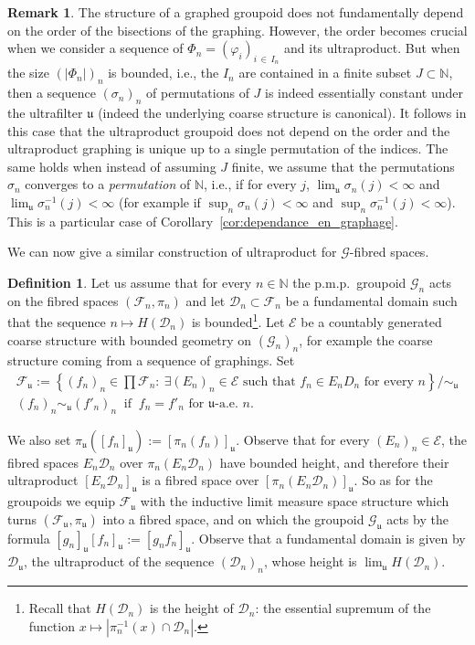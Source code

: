 \documentclass[10pt]{amsart}
\theoremstyle{definition}
\newtheorem{rema}[cdrthm]{Remark}
\newtheorem{defi}[cdrthm]{Definition}
\newcommand{\Nmath}{\mathbb{N}}
\newcommand{\coarse}{\mathcal{E}}
\newcommand{\cg}{\mathcal{G}}
\newcommand{\cf}{\mathcal{F}}
\newcommand{\cd}{\mathcal{D}}
\newcommand{\ul}{\mathfrak{u}}
\newcommand{\ulae}{\mathfrak{u}\textrm{-a.e. }n}
\newcommand{\ph}{\varphi}
\newcommand{\pmp}{p.m.p.\ }
\let\oldexists\exists
\renewcommand*{\exists}{\mathrel{\oldexists}}
\begin{document}
\begin{rema}\label{rem: order of the graphings and ultra-prod}
The structure of a graphed groupoid does not fundamentally depend on the order of the bisections of the graphing. However, the order becomes crucial when we consider a sequence of $\Phi_n=(\ph_i)_{i\,\in\,I_n}$ and its ultraproduct. But when the size $(|\Phi_n|)_n$ is bounded, i.e., the $I_n$ are contained in a finite subset $J\subset \Nmath$, then a sequence $(\sigma_n)_n$ of permutations of $J$ is indeed essentially constant under the ultrafilter $\ul$ (indeed the underlying coarse structure is canonical). It follows in this case that the ultraproduct groupoid does not depend on the order and the ultraproduct graphing is unique up to a single permutation of the indices. The same holds when instead of assuming $J$ finite, we assume that the permutations $\sigma_n$ converges to a \emph{permutation} of $\Nmath$, i.e., if for every $j$, $\lim_\ul \sigma_n(j)<\infty$ and $\lim_\ul \sigma_n^{-1}(j)<\infty$ (for example if $\sup_n \sigma_n(j)<\infty$ and $\sup_n \sigma_n^{-1}(j)<\infty$). This is a particular case of Corollary~\ref{cor:dependance_en_graphage}.
\end{rema}

We can now give a similar construction of ultraproduct for $\cg$-fibred spaces.

\begin{defi}\label{def:ultraaction}
Let us assume that for every $n\in\Nmath$ the \pmp groupoid $\cg_n$ acts on the fibred spaces $(\cf_n,\pi_n)$ and let $\cd_n\subset\cf_n$ be a fundamental domain such that the sequence $n\mapsto H(\cd_n)$ is bounded\footnote{Recall that $H(\cd_n)$ is the height of $\cd_n$: the essential supremum of the function $x\mapsto |\pi_n^{-1}(x)\cap \cd_n|$.}. Let $\coarse$ be a countably generated coarse structure with bounded geometry on $(\cg_n)_n$, for example the coarse structure coming from a sequence of graphings. Set
\begin{gather*}
\cf_\ul:=\left\lbrace (f_n)_n\in \prod\cf_n:\ \exists (E_n)_n \in \coarse \text{ such that }f_n \in E_n D_n\text{ for every }n\right\rbrace/\sim_\ul\\
(f_n)_n\sim_\ul (f'_n)_n\ \text{ if }\ f_{n}= f'_{n}\text{ for }\ulae.
\end{gather*}

We also set $\pi_\ul([f_n]_\ul):=[\pi_n(f_n)]_\ul$. Observe that for every $(E_n)_n \in \coarse$, the fibred spaces $E_n \cd_n$ over $\pi_n(E_n \cd_n)$ have bounded height, and therefore their ultraproduct $[E_n \cd_n]_\ul$ is a fibred space over $[\pi_n(E_n \cd_n)]_\ul$. So as for the groupoids we equip $\cf_\ul$ with the inductive limit measure space structure which turns $(\cf_\ul,\pi_\ul)$ into a fibred space, and on which the groupoid $\cg_\ul$ acts by the formula $[g_n]_\ul[f_n]_\ul:=[g_n f_n]_\ul$. Observe that a fundamental domain is given by $\cd_\ul$, the ultraproduct of the sequence $(\cd_n)_n$, whose height is $\lim_\ul H(\cd_n)$.
\end{defi}
\end{document}
